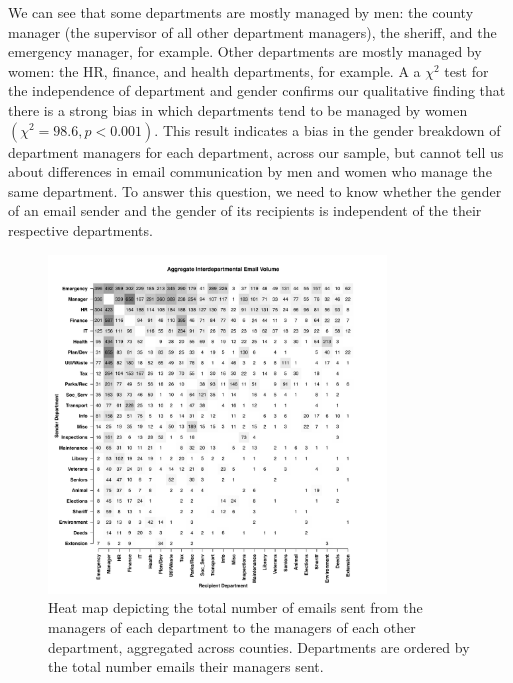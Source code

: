 \documentclass{pnastwo}
\begin{document}
\begin{article}
We can see that some departments are mostly managed by men: the county manager (the supervisor of all other department managers), the sheriff, and the emergency manager, for example. Other departments  are mostly managed by women: the HR, finance, and health departments, for example. A a $\chi^2$ test for the independence of department and gender confirms our qualitative finding that there is a strong bias in which departments tend to be managed by women $(\chi^2 = 98.6, p < 0.001)$. This result indicates a bias in the gender breakdown of department managers for each department, across our sample, but cannot tell us about differences in email communication by men and women who manage the same department. To answer this question, we need to know whether the gender of an email sender and the gender of its recipients is independent of the their respective departments. 
	
	\begin{figure}
	\centering
	\includegraphics[width = 0.8\textwidth]{images/Aggregate_Email_Flows.pdf}
	\caption{\label{fig:heatmaps}Heat map depicting the total number of emails sent from the managers of each department to the managers of each other department, aggregated across counties. Departments are ordered by the total number emails their managers sent.}
	\end{figure}

	
	

\end{article}
\end{document}
